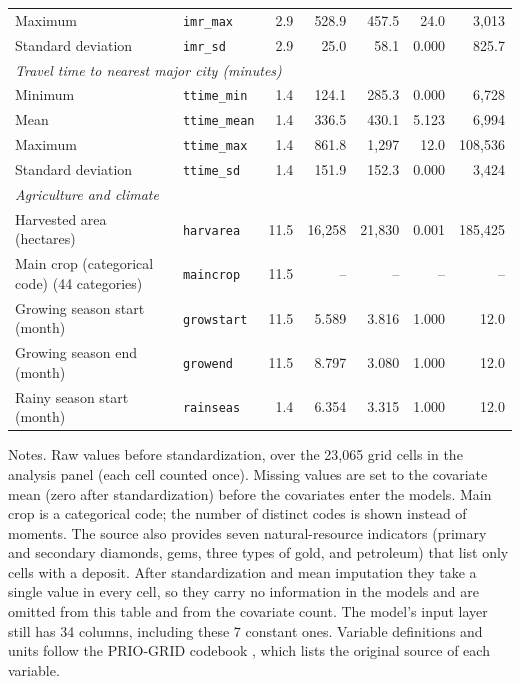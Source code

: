 \documentclass[11pt, letterpaper]{article}
\begin{document}
\begin{table}[!htbp]
\begin{tabular}{llrrrrr}
\quad Maximum & \texttt{imr\_max} & 2.9 & 528.9 & 457.5 & 24.0 & 3,013 \\
\quad Standard deviation & \texttt{imr\_sd} & 2.9 & 25.0 & 58.1 & 0.000 & 825.7 \\
\multicolumn{7}{l}{\textit{Travel time to nearest major city (minutes)}} \\
\quad Minimum & \texttt{ttime\_min} & 1.4 & 124.1 & 285.3 & 0.000 & 6,728 \\
\quad Mean & \texttt{ttime\_mean} & 1.4 & 336.5 & 430.1 & 5.123 & 6,994 \\
\quad Maximum & \texttt{ttime\_max} & 1.4 & 861.8 & 1,297 & 12.0 & 108,536 \\
\quad Standard deviation & \texttt{ttime\_sd} & 1.4 & 151.9 & 152.3 & 0.000 & 3,424 \\
\multicolumn{7}{l}{\textit{Agriculture and climate}} \\
\quad Harvested area (hectares) & \texttt{harvarea} & 11.5 & 16,258 & 21,830 & 0.001 & 185,425 \\
\quad Main crop (categorical code) (44 categories) & \texttt{maincrop} & 11.5 & -- & -- & -- & -- \\
\quad Growing season start (month) & \texttt{growstart} & 11.5 & 5.589 & 3.816 & 1.000 & 12.0 \\
\quad Growing season end (month) & \texttt{growend} & 11.5 & 8.797 & 3.080 & 1.000 & 12.0 \\
\quad Rainy season start (month) & \texttt{rainseas} & 1.4 & 6.354 & 3.315 & 1.000 & 12.0 \\
\hline
\end{tabular}
\begin{minipage}{0.95\textwidth}\footnotesize\vspace{0.5ex}
Notes. Raw values before standardization, over the 23,065 grid cells in the analysis panel (each cell counted once). Missing values are set to the covariate mean (zero after standardization) before the covariates enter the models. Main crop is a categorical code; the number of distinct codes is shown instead of moments. The source also provides seven natural-resource indicators (primary and secondary diamonds, gems, three types of gold, and petroleum) that list only cells with a deposit. After standardization and mean imputation they take a single value in every cell, so they carry no information in the models and are omitted from this table and from the covariate count. The model's input layer still has 34 columns, including these 7 constant ones. Variable definitions and units follow the PRIO-GRID codebook \citep{tollefsen2015codebook}, which lists the original source of each variable.
\end{minipage}
\end{table}
\end{document}
